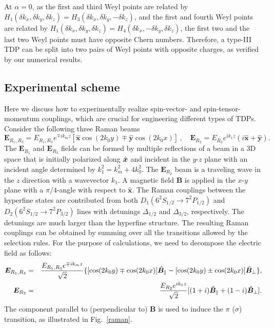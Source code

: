 \documentclass[aps,prl,floatfix,twocolumn,reprint]{revtex4}
\begin{document}
At $\alpha=0$, as the first and third Weyl points are related by $%
H_{1}(\delta k_{x},\delta k_{y},\delta k_{z})=H_{3}(\delta k_{x},\delta
k_{y},-\delta k_{z})$, and the first and fourth Weyl points are related by $%
H_{1}(\delta k_{x},\delta k_{y},\delta k_{z})=H_{4}(\delta k_{x},-\delta
k_{y},\delta k_{z})$, the first two and the last two Weyl points must have
opposite Chern numbers. Therefore, a type-III TDP can be split into two
pairs of Weyl points with opposite charges, as verified by our numerical
results.

\subsection{Experimental scheme}

Here we discuss how to experimentally realize spin-vector- and spin-tensor-momentum 
couplings, which are crucial for engineering different types of
TDPs. Consider the following three Raman beams
\begin{equation*}
\bm{E}_{R_{1},R_{3}}=E_{R_{1},R_{3}}e^{\mp ik_{m}z}[\hat{\bm{x}}\cos
(2k_{0}y)\mp \hat{\bm{y}}\cos (2k_{0}x)]\,,\quad \bm{E}%
_{R_{2}}=E_{R_{2}}e^{ik_{1}z}(i\hat{\bm{x}}+\hat{\bm{y}}).
\end{equation*}%
The $\bm{E}_{R_{1}}$ and $\bm{E}_{R_{3}}$ fields can be formed by multiple
reflections of a beam in a 3D space that is initially polarized along $\hat{%
\bm{x}}$ and incident in the $y$-$z$ plane with an incident angle determined
by $k_{1}^{2}=k_{m}^{2}+4k_{0}^{2}$. The $\bm{E}_{R_{2}}$ beam is a
traveling wave in the $z$ direction with a wavevector $k_{1}$. A magnetic
field $\bm{B}$ is applied in the $x$-$y$ plane with a $\pi /4$-angle with
respect to $\hat{\bm{x}}$. The Raman couplings between the hyperfine states
are contributed from both $D_{1}(6^{2}S_{1/2}\rightarrow 7^{2}P_{1/2})$ and $%
D_{2}(6^{2}S_{1/2}\rightarrow 7^{2}P_{3/2})$ lines with detunings $\Delta
_{1/2}$ and $\Delta _{3/2}$, respectively. The detunings are much larger
than the hyperfine structure. The resulting Raman couplings can be obtained
by summing over all the transitions allowed by the selection rules. For the
purpose of calculations, we need to decompose the electric field as follows:
\begin{eqnarray}
\bm{E}_{R_{1},R_{3}} &=&\frac{E_{R_{1},R_{3}}e^{\mp ik_{m}z}}{\sqrt{2}}%
\{[\cos (2k_{0}y)\mp \cos (2k_{0}x)]\hat{\bm{B}}_{\parallel }-[\cos
(2k_{0}y)\pm \cos (2k_{0}x)]\hat{\bm{B}}_{\perp }\},  \notag \\
\bm{E}_{R_{2}} &=&\frac{E_{R_{2}}e^{ik_{1}z}}{\sqrt{2}}[(1+i)\hat{\bm{B}}%
_{\parallel }+(1-i)\hat{\bm{B}}_{\perp }].
\end{eqnarray}%
The component parallel to (perpendicular to) $\bm{B}$ is used to induce the $%
\pi $ ($\sigma $) transition, as illustrated in Fig.~\ref{raman}.
\end{document}
